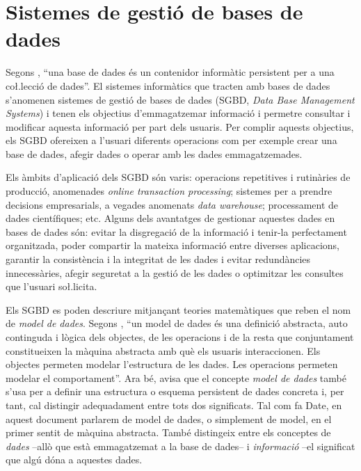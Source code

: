 \section{Sistemes de gestió de bases de dades}
\label{sec:art:sgbd}


Segons \textcite{date:introduction}, ``una base de dades és un
contenidor informàtic persistent per a una co\l.lecció de dades''. El
sistemes informàtics que tracten amb bases de dades s'anomenen
sistemes de gestió de bases de dades (SGBD, \emph{Data Base Management
  Systems}) i tenen els objectius d'emmagatzemar informació i permetre
consultar i modificar aquesta informació per part dels usuaris.  Per
complir aquests objectius, els SGBD ofereixen a l'usuari diferents
operacions com per exemple crear una base de dades, afegir dades o
operar amb les dades emmagatzemades. 

Els àmbits d'aplicació dels SGBD són varis: operacions repetitives i
rutinàries de producció, anomenades \emph{online transaction
  processing}; sistemes per a prendre decisions empresarials, a
vegades anomenats \emph{data warehouse}; processament de dades
científiques; etc.  Alguns dels avantatges de gestionar aquestes dades
en bases de dades són: evitar la disgregació de la informació i
tenir-la perfectament organitzada, poder compartir la mateixa
informació entre diverses aplicacions, garantir la consistència i la
integritat de les dades i evitar redundàncies innecessàries, afegir
seguretat a la gestió de les dades o optimitzar les consultes que
l'usuari so\l.licita.


Els SGBD es poden descriure mitjançant teories matemàtiques que reben
el nom de \emph{model de dades}.  Segons
\citeauthor{date:introduction}, ``un model de dades és una definició
abstracta, auto continguda i lògica dels objectes, de les operacions i
de la resta que conjuntament constitueixen la màquina abstracta amb
què els usuaris interaccionen. Els objectes permeten modelar
l'estructura de les dades. Les operacions permeten modelar el
comportament''. Ara bé, \citeauthor{date:introduction} avisa que el
concepte \emph{model de dades} també s'usa per a definir una
estructura o esquema persistent de dades concreta i, per tant, cal distingir
adequadament entre tots dos significats.  Tal com fa Date, en aquest
document parlarem de model de dades, o simplement de model, en el
primer sentit de màquina abstracta. També distingeix entre els
conceptes de \emph{dades} --allò que està emmagatzemat a la base de
dades-- i \emph{informació} --el significat que algú dóna a aquestes
dades.


